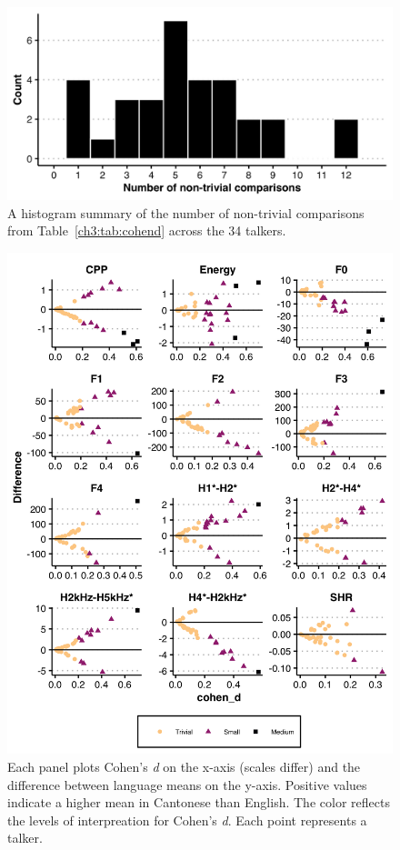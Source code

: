 \begin{figure}[htbp]
    \begin{center}
    \includegraphics[width=0.875\linewidth]{figures/ch3_nontrivial_counts_by_talker_5in.png} 
    \caption{A histogram summary of the number of non-trivial comparisons from Table~\ref{ch3:tab:cohend} across the 34 talkers.}
    \label{ch3:fig:ntcounts}
    \end{center}
\end{figure}

\begin{figure}[htbp] 
    \begin{center}
    \includegraphics[width=0.9\linewidth]{figures/ch3_cohend_part1_5in.png} 
    \caption{Each panel plots Cohen's \textit{d} on the x-axis (scales differ) and the difference between language means on the y-axis. Positive values indicate a higher mean in Cantonese than English. The color reflects the levels of interpreation for Cohen's \textit{d}. Each point represents a talker.}
    \label{ch3:fig:cohendmeasure}
    \end{center}
\end{figure}

